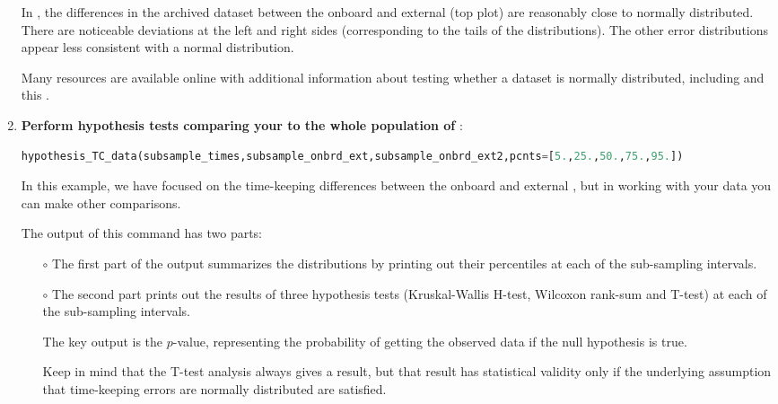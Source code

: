 \begin{enumerate}
	
	In , the differences in the archived dataset between the onboard and external \rtcs (top plot) are reasonably close to normally distributed.
	There are noticeable deviations at the left and right sides (corresponding to the tails of the distributions). 
	The other error distributions appear less consistent with a normal distribution.
	
	Many resources are available online with additional information about testing whether a dataset is normally distributed, including  and this .
	
	 

	\item \textbf{Perform hypothesis tests comparing your \rtc to the whole population of \rtcs}:
\begin{lstlisting}[language=Python]
hypothesis_TC_data(subsample_times,subsample_onbrd_ext,subsample_onbrd_ext2,pcnts=[5.,25.,50.,75.,95.])
\end{lstlisting}
	In this example, we have focused on the time-keeping differences between the onboard and external \rtcs, but in working with your data you can make other comparisons.

	\smallskip
	The output of this command has two parts:
	\begin{itemize}
		\item[$\circ$] The first part of the output summarizes the distributions by printing out their percentiles at each of the sub-sampling intervals.
		\item[$\circ$] The second part prints out the results of three hypothesis tests (Kruskal-Wallis H-test, Wilcoxon rank-sum and T-test) at each of the sub-sampling intervals.
		
		\smallskip
		The key output is the $p$-value, representing the probability of getting the observed data if the null hypothesis is true.
		
		\smallskip
		Keep in mind that the T-test analysis always gives a result, but that result has statistical validity only if the underlying assumption that time-keeping errors are normally distributed are satisfied.
	\end{itemize}

\end{enumerate}


